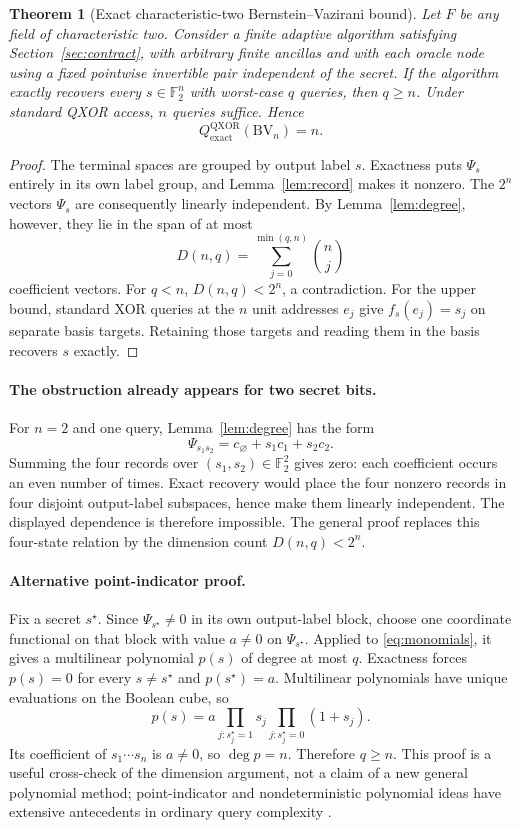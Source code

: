 \documentclass[11pt]{article}
\newtheorem{theorem}{Theorem}[section]
\newcommand{\F}{\mathbb F}
\begin{document}
\begin{theorem}[Exact characteristic-two Bernstein--Vazirani bound]\label{thm:bv}
Let $F$ be any field of characteristic two. Consider a finite adaptive algorithm satisfying Section~\ref{sec:contract}, with arbitrary finite ancillas and with each oracle node using a fixed pointwise invertible pair independent of the secret. If the algorithm exactly recovers every $s\in\F_2^n$ with worst-case $q$ queries, then $q\ge n$. Under standard QXOR access, $n$ queries suffice. Hence
\[
 Q_{\mathrm{exact}}^{\mathrm{QXOR}}(\mathrm{BV}_n)=n.
\]
\end{theorem}
\begin{proof}
The terminal spaces are grouped by output label $s$. Exactness puts $\Psi_s$ entirely in its own label group, and Lemma~\ref{lem:record} makes it nonzero. The $2^n$ vectors $\Psi_s$ are consequently linearly independent. By Lemma~\ref{lem:degree}, however, they lie in the span of at most
\[
 D(n,q)=\sum_{j=0}^{\min(q,n)}\binom nj
\]
coefficient vectors. For $q<n$, $D(n,q)<2^n$, a contradiction. For the upper bound, standard XOR queries at the $n$ unit addresses $e_j$ give $f_s(e_j)=s_j$ on separate basis targets. Retaining those targets and reading them in the basis recovers $s$ exactly.
\end{proof}

\paragraph{The obstruction already appears for two secret bits.}
For $n=2$ and one query, Lemma~\ref{lem:degree} has the form
\[
 \Psi_{s_1s_2}=c_\varnothing+s_1c_1+s_2c_2.
\]
Summing the four records over $(s_1,s_2)\in\F_2^2$ gives zero: each coefficient occurs an even number of times. Exact recovery would place the four nonzero records in four disjoint output-label subspaces, hence make them linearly independent. The displayed dependence is therefore impossible. The general proof replaces this four-state relation by the dimension count $D(n,q)<2^n$.

\paragraph{Alternative point-indicator proof.}
Fix a secret $s^{\star}$. Since $\Psi_{s^{\star}}\ne0$ in its own output-label block, choose one coordinate functional on that block with value $a\ne0$ on $\Psi_{s^{\star}}$. Applied to \eqref{eq:monomials}, it gives a multilinear polynomial $p(s)$ of degree at most $q$. Exactness forces $p(s)=0$ for every $s\ne s^{\star}$ and $p(s^{\star})=a$. Multilinear polynomials have unique evaluations on the Boolean cube, so
\[
 p(s)=a\prod_{j:s^{\star}_j=1}s_j
       \prod_{j:s^{\star}_j=0}(1+s_j).
\]
Its coefficient of $s_1\cdots s_n$ is $a\ne0$, so $\deg p=n$. Therefore $q\ge n$. This proof is a useful cross-check of the dimension argument, not a claim of a new general polynomial method; point-indicator and nondeterministic polynomial ideas have extensive antecedents in ordinary query complexity \cite{Beals2001,deWolf2003}.
\end{document}

